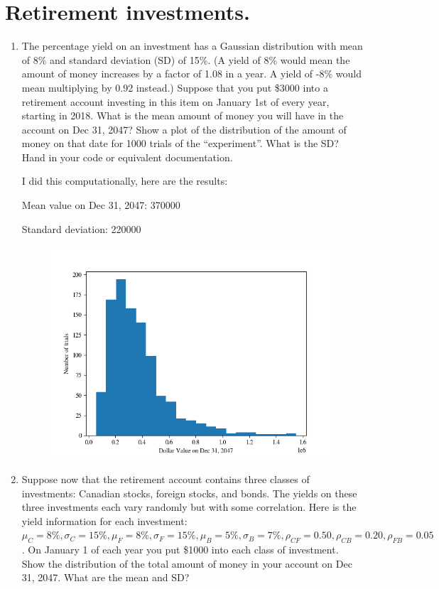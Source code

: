\section{Retirement investments.}

\begin{enumerate}[label=\textbf{\Alph*}.]

    \item The percentage yield on an investment has a Gaussian distribution with mean of 8\% and standard deviation (SD) of 15\%. (A yield of 8\% would mean the amount of money increases by a factor of 1.08 in a year. A yield of -8\% would mean multiplying by 0.92 instead.) Suppose that you put \$3000 into a retirement account investing in this item on January 1st of every year, starting in 2018. What is the mean amount of money you will have in the account on Dec 31, 2047? Show a plot of the distribution of the amount of money on that date for 1000 trials of the ``experiment''. What is the SD? Hand in your code or equivalent documentation.

    I did this computationally, here are the results:

    Mean value on Dec 31, 2047: 370000

    Standard deviation: 220000

    \begin{figure}[H]
        \includegraphics[width=\textwidth]{q4_a.png}
    \end{figure}

    \item Suppose now that the retirement account contains three classes of investments: Canadian stocks, foreign stocks, and bonds. The yields on these three investments each vary randomly but with some correlation. Here is the yield information for each investment: $\mu_C = 8\%, \sigma_C = 15\%, \mu_F = 8\%, \sigma_F = 15\%, \mu_B = 5\%, \sigma_B = 7\%, \rho_{CF}=0.50, \rho_{CB}=0.20, \rho_{FB}=0.05$. On January 1 of each year you put \$1000 into each class of investment. Show the distribution of the total amount of money in your account on Dec 31, 2047. What are the mean and SD?


\end{enumerate}
